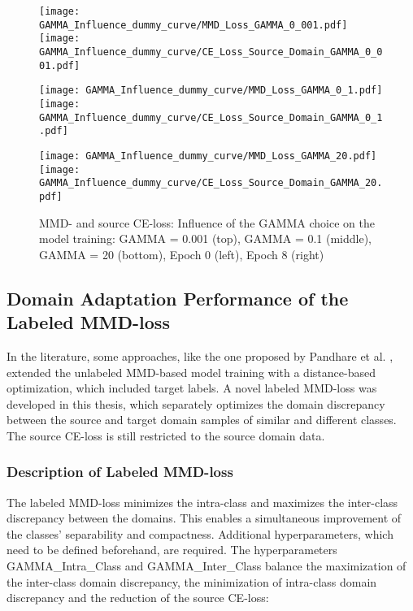 \begin{figure}[H]
  \centering
  \texttt{[image: GAMMA\_Influence\_dummy\_curve/MMD\_Loss\_GAMMA\_0\_001.pdf]}
  \hspace{.3cm}
  \texttt{[image: GAMMA\_Influence\_dummy\_curve/CE\_Loss\_Source\_Domain\_GAMMA\_0\_001.pdf]}

  \vspace{.1cm}

  \texttt{[image: GAMMA\_Influence\_dummy\_curve/MMD\_Loss\_GAMMA\_0\_1.pdf]}
  \hspace{.3cm}
  \texttt{[image: GAMMA\_Influence\_dummy\_curve/CE\_Loss\_Source\_Domain\_GAMMA\_0\_1.pdf]}

  \vspace{.1cm}

  \texttt{[image: GAMMA\_Influence\_dummy\_curve/MMD\_Loss\_GAMMA\_20.pdf]}
  \hspace{.1cm}
  \texttt{[image: GAMMA\_Influence\_dummy\_curve/CE\_Loss\_Source\_Domain\_GAMMA\_20.pdf]}

  \caption{MMD- and source CE-loss: Influence of the GAMMA choice on the model training: GAMMA = 0.001 (top), GAMMA = 0.1 (middle), GAMMA = 20 (bottom), Epoch 0 (left), Epoch 8 (right)}
  \label{fig:learning_curves_influence_mmd_feature_extractor}
\end{figure}

\subsection{Domain Adaptation Performance of the Labeled MMD-loss} \label{sec:Differences of labeled and unlabeled MMD loss}

In the literature, some approaches, like the one proposed by Pandhare et al. \cite{Pandhare2021}, extended the unlabeled MMD-based model training with a distance-based optimization, which included target labels. A novel labeled MMD-loss was developed in this thesis, which separately optimizes the domain discrepancy between the source and target domain samples of similar and different classes. The source CE-loss is still restricted to the source domain data.
\subsubsection{Description of Labeled MMD-loss}
The labeled MMD-loss minimizes the intra-class and maximizes the inter-class discrepancy between the domains. This enables a simultaneous improvement of the classes' separability and compactness. Additional hyperparameters, which need to be defined beforehand, are required. The hyperparameters GAMMA\_Intra\_Class and GAMMA\_Inter\_Class balance the maximization of the inter-class domain discrepancy, the minimization of intra-class domain discrepancy and the reduction of the source CE-loss:


